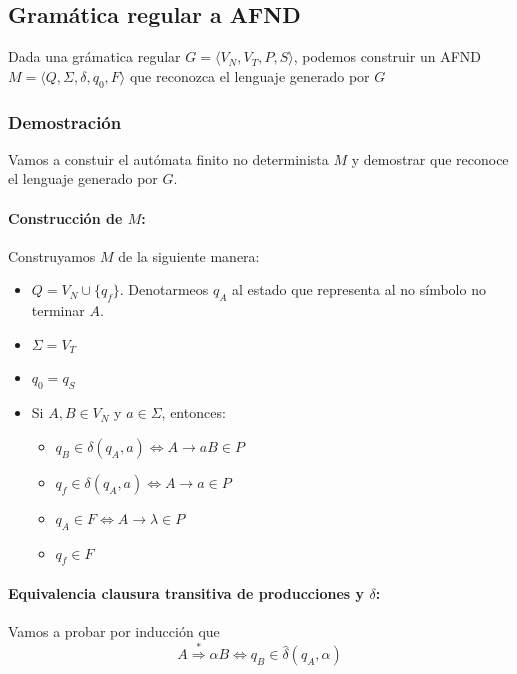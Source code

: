 \newpage
\subsection{Gramática regular a AFND}
Dada una grámatica regular \(G = \langle V_N, V_T, P, S\rangle\), podemos construir un AFND \\ \(M=\langle Q,\Sigma, \delta, q_0, F\rangle\) que reconozca el lenguaje generado por \(G\)

\subsubsection{Demostración}
Vamos a constuir el autómata finito no determinista \(M\) y demostrar que reconoce el lenguaje generado por \(G\).
\paragraph{Construcción de \(M\):} Construyamos \(M\) de la siguiente manera:
\begin{itemize}
  \item \(Q = V_N\cup\{q_f\}\). Denotarmeos \(q_A\) al estado que representa al no símbolo no terminar \(A\).
  \item \(\Sigma = V_T\)
  \item \(q_0 = q_S\)
  \item Si \(A, B \in V_N\) y \(a\in\Sigma\), entonces:
        \begin{itemize}
          \item \(q_B\in\delta(q_A, a) \iff A \rightarrow aB \in P\)
          \item \(q_f \in \delta(q_A, a) \iff A \rightarrow a \in P\)
          \item \(q_A\in F \iff A \rightarrow \lambda \in P\)
          \item \(q_f\in F\)
        \end{itemize}
\end{itemize}

\paragraph{Equivalencia clausura transitiva de producciones y \(\delta\): } Vamos a probar por inducción que
\[A   \overset{*}{\Rightarrow} \alpha B \iff q_B\in\hat\delta(q_A, \alpha)\]

